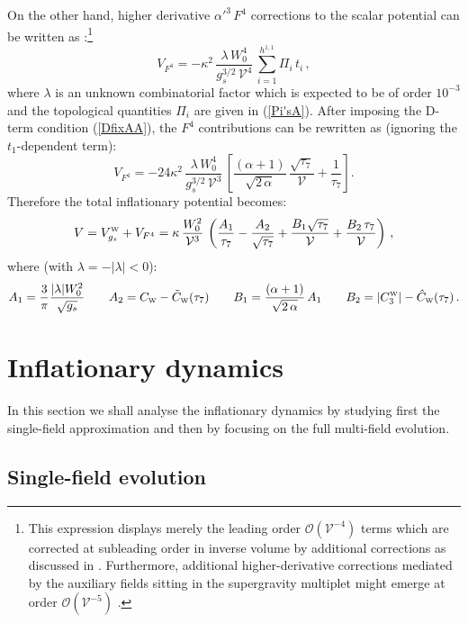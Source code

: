 \documentclass[11pt,a4paper]{article}
\newcommand{\be}{\begin{equation}}
\newcommand{\ee}{\end{equation}}
\def\nn{\nonumber}
\def\W{{\scriptscriptstyle \rm W}}
\newcommand\vo{{\mathcal{V}}}
\newcommand{\mc}{\mathcal}
\begin{document}
On the other hand, higher derivative $\alpha'^3\,F^4$ corrections to the scalar potential can be written as \cite{Ciupke:2015msa}:\footnote{This expression displays merely the leading order $\mc{O}(\vo^{-4})$ terms which are corrected at subleading order in inverse volume by additional corrections as discussed in \cite{Cicoli:2016chb}. Furthermore, additional higher-derivative corrections mediated by the auxiliary fields sitting in the supergravity multiplet might emerge at order $\mc{O}(\vo^{-5})$ \cite{Cicoli:2016chb, Ciupke:2016agp}.}
\be
V_{F^4}=-\kappa^2\,\frac{\lambda\,W_0^4}{g_s^{3/2}\,\vo^4}\,\sum_{i=1}^{h^{1,1}}\Pi_i\,t_i\,,
\ee
where $\lambda$ is an unknown combinatorial factor which is expected to be of order $10^{-3}$ \cite{Ciupke:2015msa, Grimm:2017okk} and the topological quantities $\Pi_i$ are given in (\ref{Pi'sA}). After imposing the D-term condition (\ref{DfixAA}), the $F^4$ contributions can be rewritten as (ignoring the $t_1$-dependent term):
\be
V_{F^4} = -24\kappa^2\,\frac{\lambda\,W_0^4}{g_s^{3/2}\,\vo^3}\,\left[\frac{(\alpha+1)}{\sqrt{2\,\alpha}}\,\frac{\sqrt{\tau_7}}{\vo}+\frac{1}{\tau_7}\right].
\ee
Therefore the total inflationary potential becomes:
\be
V = V_{g_s}^\W+V_{F^4}= \kappa\,\frac{W_0^2}{\vo^3}\,
\left(\frac{A_1}{\tau_7}-\frac{A_2}{\sqrt{\tau_7}}  + \frac{B_1\sqrt{\tau_7}}{\vo}+\frac{B_2 \,\tau_7}{\vo}\right)\,,
\label{exA_tot_pot}
\ee
where (with $\lambda=-|\lambda|<0$):
\be
A_1 = \frac{3}{\pi}  \frac{|\lambda| W_0^2}{\sqrt{g_s}} \qquad A_2 = C_\W - \tilde{C}_\W(\tau_7)
\qquad B_1 = \frac{(\alpha+1)}{\sqrt{2\,\alpha}}\,A_1
\qquad B_2 = |C_3^\W| - \hat{C}_\W(\tau_7)\,. \nn
\ee

\section{Inflationary dynamics}
\label{InfAn}

In this section we shall analyse the inflationary dynamics by studying first the single-field approximation and then by focusing on the full multi-field evolution.

\subsection{Single-field evolution}
\label{exA_inf}
\end{document}
